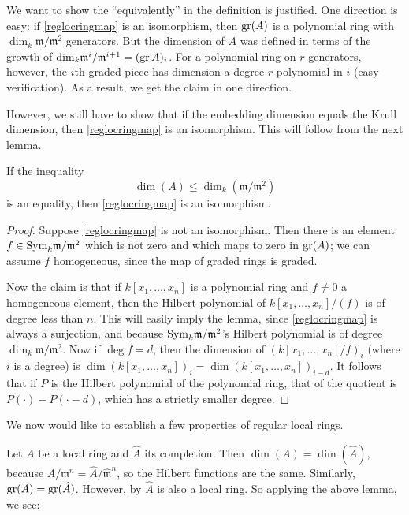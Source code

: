 We want to show the ``equivalently'' in the definition is justified.
One direction is easy: if \eqref{reglocringmap} is an isomorphism, then
$\operatorname{gr}(A)$ is a polynomial ring with $\dim_k \mathfrak{m}/\mathfrak{m}^2$
generators. But the dimension of $A$ was defined in terms of the growth of
$\mathrm{dim}_k \mathfrak{m}^i/\mathfrak{m}^{i+1}  = (\operatorname{gr} A)_i$. 
For a polynomial ring on $r$ generators, however, the $i$th graded piece has
dimension a degree-$r$ polynomial in $i$ (easy verification). 
As a result, we get the claim in one direction.

However, we still have to show that if the embedding dimension equals the Krull
dimension, then \eqref{reglocringmap} is an isomorphism. This will follow from
the next lemma.

\begin{lemma} If the inequality \[\dim(A) \leq
\dim_{k}(\mathfrak{m}/\mathfrak{m}^2)\]
is an equality, then \eqref{reglocringmap} is an isomorphism. 
\end{lemma}
\begin{proof}
Suppose \eqref{reglocringmap} is not an isomorphism. 
Then there is an element $f \in \mathrm{Sym}_k \mathfrak{m}/\mathfrak{m}^2$ which is
not zero and which maps to zero in $\operatorname{gr}(A)$; we can assume $f$ homogeneous,
since the map of graded rings is graded.


Now the claim is that if $k[x_1, \dots, x_n]$ is a polynomial ring and $f \neq
0$ a homogeneous element, then the Hilbert polynomial of $k[x_1, \dots,
x_n]/(f)$ is of degree less than $n$. This will easily imply the lemma, since
\eqref{reglocringmap} is always a surjection, and because $\mathrm{Sym}_k
\mathfrak{m}/\mathfrak{m}^2$'s Hilbert polynomial is of degree $\dim_{k}
\mathfrak{m}/\mathfrak{m}^2$. 
Now if $\deg f = d$, then the dimension of $(k[x_1, \dots, x_n]/f)_i$ (where
$i$ is a degree) is $\dim (k[x_1, \dots, x_n])_i = \dim (k[x_1, \dots,
x_n])_{i-d}$. It follows that if $P$ is the Hilbert polynomial of the
polynomial ring, that of the quotient is $P(\cdot) - P(\cdot - d)$, which has a
strictly smaller degree. 
\end{proof}

We now would like to establish a few  properties of regular local rings. 

Let $A$ be a local ring and $\hat{A}$ its completion. Then
$\dim(A)=\dim(\hat{A})$, because
$A/\mathfrak{m}^n=\hat{A}/\hat{\mathfrak{m}}^n$, so the Hilbert functions are
the same. Similarly, $\operatorname{gr}(A)=\operatorname{gr}(\hat{A})$. However, by  $\hat{A}$ is also a
local ring. So applying the above lemma, we see:

